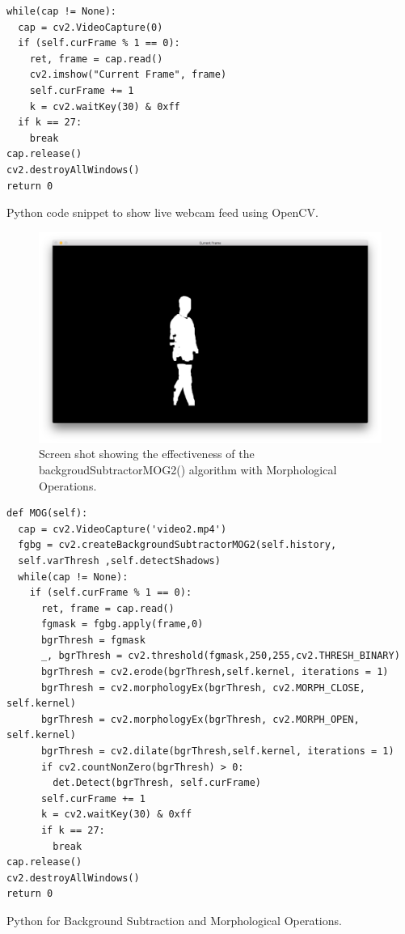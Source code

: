 \documentclass[11pt,a4paper]{report}
\begin{document}
\begin{listing}
\begin{verbatim}
while(cap != None):
  cap = cv2.VideoCapture(0)
  if (self.curFrame % 1 == 0):
    ret, frame = cap.read()
    cv2.imshow("Current Frame", frame)
    self.curFrame += 1
    k = cv2.waitKey(30) & 0xff
  if k == 27:
  	break
cap.release()
cv2.destroyAllWindows()
return 0
\end{verbatim}
\caption{Python code snippet to show live webcam feed using OpenCV.}
\label{displayInputVideo}
\end{listing}

\begin{figure}[H]
 \centering
 \includegraphics[scale = 0.22]{bgSubExample.png}
 \caption{Screen shot showing the effectiveness of the backgroudSubtractorMOG2() algorithm with Morphological Operations.}
 \label{fig:backgroundSub}
\end{figure}

\begin{listing}
\begin{verbatim}
def MOG(self):
  cap = cv2.VideoCapture('video2.mp4')
  fgbg = cv2.createBackgroundSubtractorMOG2(self.history, 
  self.varThresh ,self.detectShadows)
  while(cap != None):
    if (self.curFrame % 1 == 0):
      ret, frame = cap.read()
      fgmask = fgbg.apply(frame,0)
      bgrThresh = fgmask
      _, bgrThresh = cv2.threshold(fgmask,250,255,cv2.THRESH_BINARY)
      bgrThresh = cv2.erode(bgrThresh,self.kernel, iterations = 1)
      bgrThresh = cv2.morphologyEx(bgrThresh, cv2.MORPH_CLOSE, self.kernel)
      bgrThresh = cv2.morphologyEx(bgrThresh, cv2.MORPH_OPEN, self.kernel)
      bgrThresh = cv2.dilate(bgrThresh,self.kernel, iterations = 1)
      if cv2.countNonZero(bgrThresh) > 0:
      	det.Detect(bgrThresh, self.curFrame)
      self.curFrame += 1
      k = cv2.waitKey(30) & 0xff
      if k == 27:
      	break
cap.release()
cv2.destroyAllWindows()
return 0
\end{verbatim}
\caption{Python for Background Subtraction and Morphological Operations.}
\label{bgSubPython}
\end{listing}
\end{document}
